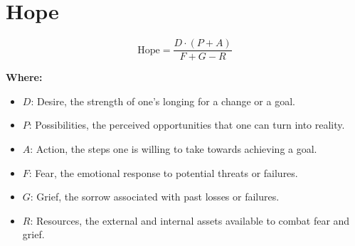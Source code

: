 \chapter{Hope}

\begin{equation}
\text{Hope} = \frac{D \cdot (P + A)}{F + G - R}
\end{equation}

\textbf{Where:}

\begin{itemize}
    \item $D$: Desire, the strength of one's longing for a change or a goal.
    \item $P$: Possibilities, the perceived opportunities that one can turn into reality.
    \item $A$: Action, the steps one is willing to take towards achieving a goal.
    \item $F$: Fear, the emotional response to potential threats or failures.
    \item $G$: Grief, the sorrow associated with past losses or failures.
    \item $R$: Resources, the external and internal assets available to combat fear and grief.
\end{itemize}